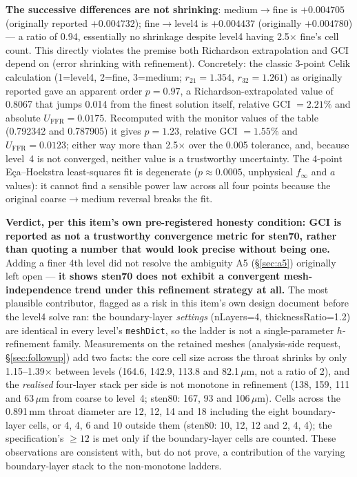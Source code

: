 \documentclass[11pt]{article}
\begin{document}
\textbf{The successive differences are not shrinking}: medium$\to$fine is $+0.004705$ (originally
reported $+0.004732$); fine$\to$level4 is $+0.004437$ (originally $+0.004780$) --- a ratio of 0.94, essentially
no shrinkage despite level4 having 2.5$\times$ fine's cell count. This directly violates the premise both Richardson extrapolation and GCI depend on (error
shrinking with refinement). Concretely: the classic 3-point Celik calculation (1=level4,
2=fine, 3=medium; $r_{21}=1.354$, $r_{32}=1.261$) as originally reported gave an apparent order $p=0.97$, a
Richardson-extrapolated value of 0.8067 that jumps 0.014 from the finest solution itself, relative GCI
$=2.21\%$ and absolute $U_\text{FFR}=0.0175$. Recomputed with the monitor values of the table (0.792342 and
0.787905) it gives $p=1.23$, relative GCI $=1.55\%$ and $U_\text{FFR}=0.0123$; either way more than
2.5$\times$ over the 0.005 tolerance, and, because level~4 is not converged, neither value is a
trustworthy uncertainty. The 4-point Eça--Hoekstra least-squares fit is degenerate
($p\approx0.0005$, unphysical $f_\infty$ and $a$ values): it cannot find a sensible power law across all
four points because the original coarse$\to$medium reversal breaks the fit.

\textbf{Verdict, per this item's own pre-registered honesty condition: GCI is reported as not a
trustworthy convergence metric for sten70, rather than quoting a number that would look precise without
being one.} Adding a finer 4th level did not resolve the ambiguity A5 (\S\ref{sec:a5}) originally left
open --- \textbf{it shows sten70 does not exhibit a convergent mesh-independence trend under this
refinement strategy at all.} The most plausible contributor, flagged as a risk in this item's own design
document before the level4 solve ran: the boundary-layer \emph{settings} (nLayers=4, thicknessRatio=1.2) are identical in
every level's \texttt{meshDict}, so the ladder is not a single-parameter $h$-refinement family. Measurements on the retained meshes
(analysis-side request, \S\ref{sec:followup}) add two facts: the core cell size across the throat shrinks by only 1.15--1.39$\times$
between levels (164.6, 142.9, 113.8 and 82.1\,$\mu$m, not a ratio of 2), and the \emph{realised} four-layer stack per side is not monotone
in refinement (138, 159, 111 and 63\,$\mu$m from coarse to level~4; sten80: 167, 93 and 106\,$\mu$m). Cells across the 0.891\,mm throat diameter are 12, 12, 14 and 18 including the eight boundary-layer
cells, or 4, 4, 6 and 10 outside them (sten80: 10, 12, 12 and 2, 4, 4); the specification's $\geq12$ is met only if the boundary-layer cells are counted. These
observations are consistent with, but do not prove, a contribution of the varying boundary-layer stack to the non-monotone ladders.
\end{document}
